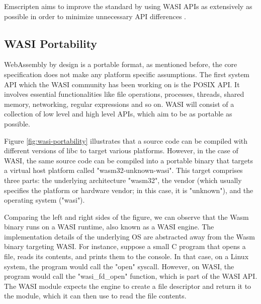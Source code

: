 Emscripten aims to improve the standard by using WASI APIs as extensively as possible in order to minimize unnecessary API differences \cite{zakai_2019_outside}. 

\subsection{WASI Portability}
\label{subsec:wasi-portability}

WebAssembly by design is a portable format, as mentioned before, the core specification does not make any platform specific assumptions. 
The first system API which the WASI community has been working on is the \gls{POSIX} API. 
It involves essential functionalities like file operations, processes, threads, 
shared memory, networking, regular expressions and so on. WASI will consist of a collection of low level and high level APIs, which aim to be as portable as possible. 

Figure \ref{fig:wasi-portability} illustrates that a source code can be compiled with different versions of \gls{libc} to target various platforms. However, in the case of WASI, the same source code can be compiled into a portable binary that targets a virtual host platform called "wasm32-unknown-wasi". 
This target comprises three parts: the underlying architecture "wasm32", the vendor (which usually specifies the platform or hardware vendor; in this case, it is "unknown"), and the operating system ("wasi").

Comparing the left and right sides of the figure, we can observe that the Wasm binary runs on a WASI runtime, also known as a WASI engine. The implementation details of the underlying OS are abstracted away from the Wasm binary targeting WASI. For instance, suppose a small C program that opens a file, reads its contents, and prints them to the console. In that case, on a Linux system, the program would call the "open" syscall. 
However, on WASI, the program would call the "wasi\_fd\_open" function, which is part of the WASI API. 
The WASI module expects the engine to create a file descriptor and return it to the module, which it can then use to read the file contents.

